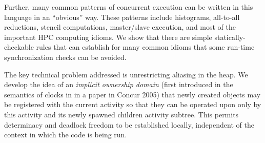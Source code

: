 Further, many common patterns of concurrent execution can be written
in this language in an ``obvious'' way. These patterns include
histograms, all-to-all reductions, stencil computations, master/slave
execution, and most of the important HPC computing idioms. We show
that there are simple statically-checkable rules that can establish
for many common idioms that some run-time synchronization checks can
be avoided.

The key technical problem addressed is unrestricting aliasing in the
heap.  We develop the idea of an {\em implicit ownership domain}
(first introduced in the semantics of clocks in \Xten{} in a paper in
Concur 2005) that newly created objects may be registered with the
current activity so that they can be operated upon only by this
activity and its newly spawned children activity subtree.  This
permits determinacy and deadlock freedom to be established locally,
independent of the context in which the code is being run.
